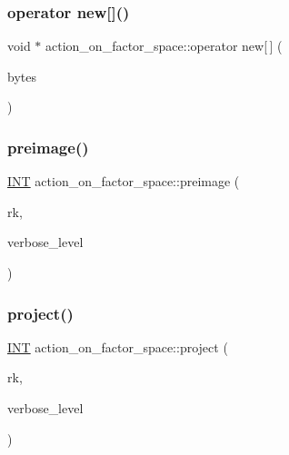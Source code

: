 \mbox{\label{classaction__on__factor__space_a575c049712f3ed871aef8b68455daed8}} 
\subsubsection{\texorpdfstring{operator new[]()}{operator new[]()}}
{\footnotesize\ttfamily void $\ast$ action\+\_\+on\+\_\+factor\+\_\+space\+::operator new\mbox{[}$\,$\mbox{]} (\begin{DoxyParamCaption}\item[{size\+\_\+t}]{bytes }\end{DoxyParamCaption})}

\mbox{\label{classaction__on__factor__space_aecf47f35bdb5f4abaf9071d927032761}} 
\subsubsection{\texorpdfstring{preimage()}{preimage()}}
{\footnotesize\ttfamily \mbox{\hyperlink{galois_8h_a09fddde158a3a20bd2dcadb609de11dc}{I\+NT}} action\+\_\+on\+\_\+factor\+\_\+space\+::preimage (\begin{DoxyParamCaption}\item[{\mbox{\hyperlink{galois_8h_a09fddde158a3a20bd2dcadb609de11dc}{I\+NT}}}]{rk,  }\item[{\mbox{\hyperlink{galois_8h_a09fddde158a3a20bd2dcadb609de11dc}{I\+NT}}}]{verbose\+\_\+level }\end{DoxyParamCaption})}

\mbox{\label{classaction__on__factor__space_a338dca4b52c11e2579944ddd4c53364c}} 
\subsubsection{\texorpdfstring{project()}{project()}}
{\footnotesize\ttfamily \mbox{\hyperlink{galois_8h_a09fddde158a3a20bd2dcadb609de11dc}{I\+NT}} action\+\_\+on\+\_\+factor\+\_\+space\+::project (\begin{DoxyParamCaption}\item[{\mbox{\hyperlink{galois_8h_a09fddde158a3a20bd2dcadb609de11dc}{I\+NT}}}]{rk,  }\item[{\mbox{\hyperlink{galois_8h_a09fddde158a3a20bd2dcadb609de11dc}{I\+NT}}}]{verbose\+\_\+level }\end{DoxyParamCaption})}

